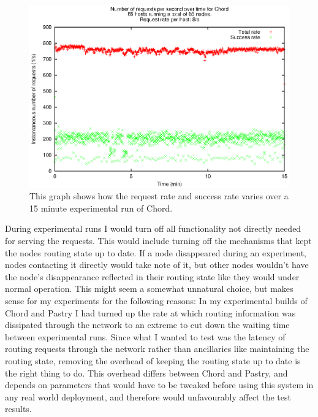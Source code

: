 \begin{figure}[!htbp]
  \begin{center}
    \includegraphics[width=0.9\linewidth]{illustrations/rate_against_time_chord.eps}
    \caption{This graph shows how the request rate and success rate varies over a 15 minute experimental run of Chord.}
    \label{figRateAgainstTime}
  \end{center}
\end{figure}

During experimental runs I would turn off all functionality not directly needed for serving the requests. This would include turning off the mechanisms that kept the nodes routing state up to date. If a node disappeared during an experiment, nodes contacting it directly would take note of it, but other nodes wouldn't have the node's disappearance reflected in their routing state like they would under normal operation. This might seem a somewhat unnatural choice, but makes sense for my experiments for the following reasons:
In my experimental builds of Chord and Pastry I had turned up the rate at which routing information was dissipated through the network to an extreme to cut down the waiting time between experimental runs. Since what I wanted to test was the latency of routing requests through the network rather than ancillaries like maintaining the routing state, removing the overhead of keeping the routing state up to date is the right thing to do. This overhead differs between Chord and Pastry, and depends on parameters that would have to be tweaked before using this system in any real world deployment, and therefore would unfavourably affect the test results.

\mbox{}


